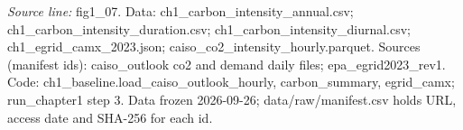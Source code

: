 {\scriptsize\textit{Source line:} fig1\_\allowbreak{}07. Data: ch1\_\allowbreak{}carbon\_\allowbreak{}intensity\_\allowbreak{}annual.csv; ch1\_\allowbreak{}carbon\_\allowbreak{}intensity\_\allowbreak{}duration.csv; ch1\_\allowbreak{}carbon\_\allowbreak{}intensity\_\allowbreak{}diurnal.csv; ch1\_\allowbreak{}egrid\_\allowbreak{}camx\_\allowbreak{}2023.json; caiso\_\allowbreak{}co2\_\allowbreak{}intensity\_\allowbreak{}hourly.parquet. Sources (manifest ids): caiso\_\allowbreak{}outlook co2 and demand daily files; epa\_\allowbreak{}egrid2023\_\allowbreak{}rev1. Code: ch1\_\allowbreak{}baseline.load\_\allowbreak{}caiso\_\allowbreak{}outlook\_\allowbreak{}hourly, carbon\_\allowbreak{}summary, egrid\_\allowbreak{}camx; run\_\allowbreak{}chapter1 step 3. Data frozen 2026-09-26; data/raw/manifest.csv holds URL, access date and SHA-256 for each id.}